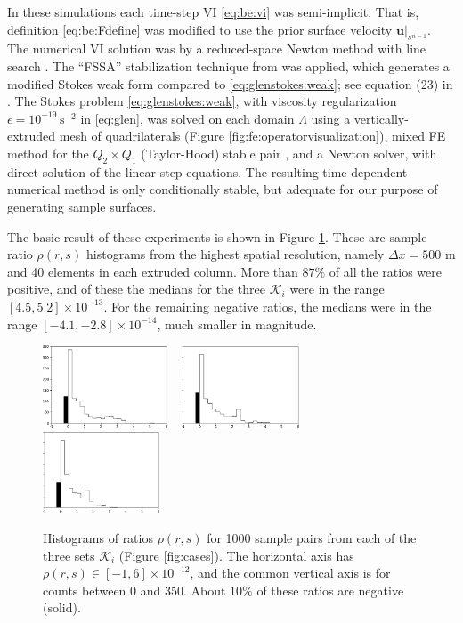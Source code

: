 \documentclass[hidelinks,onefignum,onetabnum,final]{siamart220329}  %
\newcommand{\eps}{\epsilon}
\newcommand{\bu}{\mathbf{u}}
\newcommand{\cK}{\mathcal{K}}
\begin{document}
In these simulations each time-step VI \eqref{eq:be:vi} was semi-implicit.  That is, definition \eqref{eq:be:Fdefine} was modified to use the prior surface velocity $\bu|_{s^{n-1}}$.  The numerical VI solution was by a reduced-space Newton method with line search \cite{BensonMunson2006}.  The ``FSSA'' stabilization technique from \cite{LofgrenAhlkronaHelanow2022} was applied, which generates a modified Stokes weak form compared to \eqref{eq:glenstokes:weak}; see equation (23) in \cite{LofgrenAhlkronaHelanow2022}.  The Stokes problem \eqref{eq:glenstokes:weak}, with viscosity regularization $\eps=10^{-19}\, \text{s}^{-2}$ in \eqref{eq:glen}, was solved on each domain $\Lambda$ using a vertically-extruded mesh of quadrilaterals (Figure \ref{fig:fe:operatorvisualization}), mixed FE method for the $Q_2\times Q_1$ (Taylor-Hood) stable pair \cite{Elmanetal2014}, and a Newton solver, with direct solution of the linear step equations.  The resulting time-dependent numerical method is only conditionally stable, but adequate for our purpose of generating sample surfaces.

The basic result of these experiments is shown in Figure \ref{fig:ratios}.  These are sample ratio $\rho(r,s)$ histograms from the highest spatial resolution, namely $\Delta x=500$ m and 40 elements in each extruded column.  More than $87\%$ of all the ratios were positive, and of these the medians for the three $\cK_i$ were in the range $[4.5,5.2] \times 10^{-13}$.  For the remaining negative ratios, the medians were in the range $[-4.1,-2.8]\times 10^{-14}$, much smaller in magnitude.

\begin{figure}[ht]
\mbox{\includegraphics[width=0.33\textwidth]{figs/flatratios.png} \, \includegraphics[width=0.31\textwidth]{figs/smoothratios.png} \, \includegraphics[width=0.31\textwidth]{figs/roughratios.png}}

\caption{Histograms of ratios $\rho(r,s)$ for 1000 sample pairs from each of the three sets $\cK_i$ (Figure \ref{fig:cases}).  The horizontal axis has  $\rho(r,s) \in [-1,6]\times 10^{-12}$, and the common vertical axis is for counts between 0 and 350.  About $10\%$ of these ratios are negative (solid).}
\label{fig:ratios}
\end{figure}
\end{document}
